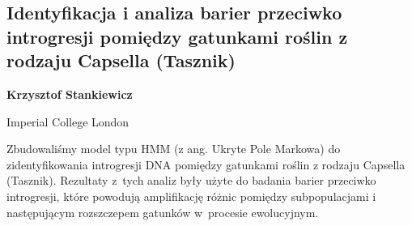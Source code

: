 \documentclass[\main/boa.tex]{subfiles}
\begin{document}
\subsection[Identyfikacja i analiza barier przeciwko introgresji pomiędzy gatunkami roślin z rodzaju Capsella (Tasznik)]{Identyfikacja i analiza barier przeciwko introgresji pomiędzy gatunkami roślin z rodzaju Capsella (Tasznik)}

\begin{minipage}{0.915\textwidth}
	\centering
  {\bf {} Krzysztof Stankiewicz}
\end{minipage}

\begin{affiliations}
\begin{minipage}{0.915\textwidth}
\centering
Imperial College London \\[-2pt]
\end{minipage}
\end{affiliations}

\vskip 0.3cm
Zbudowaliśmy model typu HMM (z ang. Ukryte Pole Markowa) do zidentyfikowania introgresji DNA pomiędzy gatunkami roślin z rodzaju Capsella (Tasznik). Rezultaty z~tych analiz były użyte do badania barier przeciwko introgresji, które powodują amplifikację różnic pomiędzy subpopulacjami i następującym rozszczepem gatunków w~procesie ewolucyjnym.
\end{document}
